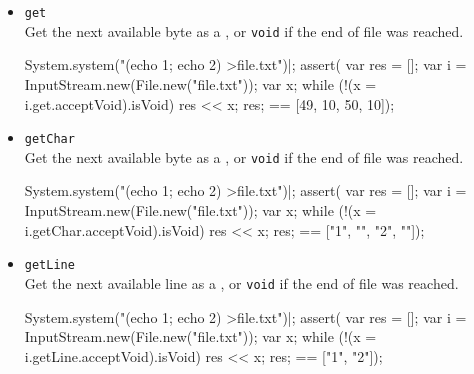 \begin{itemize}
\item \lstinline|get|\\
  Get the next available byte as a , or
  \lstinline|void| if the end of file was reached.
\begin{urbiscript}[firstnumber=last]
System.system("(echo 1; echo 2) >file.txt")|;
assert(
  {
    var res = [];
    var i = InputStream.new(File.new("file.txt"));
    var x;
    while (!(x = i.get.acceptVoid).isVoid)
      res << x;
    res;
  }
  ==
  [49, 10, 50, 10]);
\end{urbiscript}

\item \lstinline|getChar|\\
  Get the next available byte as a , or
  \lstinline|void| if the end of file was reached.
\begin{urbiscript}[firstnumber=last]
System.system("(echo 1; echo 2) >file.txt")|;
assert(
  {
    var res = [];
    var i = InputStream.new(File.new("file.txt"));
    var x;
    while (!(x = i.getChar.acceptVoid).isVoid)
      res << x;
    res;
  }
  ==
  ["1", "\n", "2", "\n"]);
\end{urbiscript}

\item \lstinline|getLine|\\
  Get the next available line as a , or
  \lstinline|void| if the end of file was reached.
\begin{urbiscript}[firstnumber=last]
System.system("(echo 1; echo 2) >file.txt")|;
assert(
  {
    var res = [];
    var i = InputStream.new(File.new("file.txt"));
    var x;
    while (!(x = i.getLine.acceptVoid).isVoid)
      res << x;
    res;
  }
  ==
  ["1", "2"]);
\end{urbiscript}
\end{itemize}


